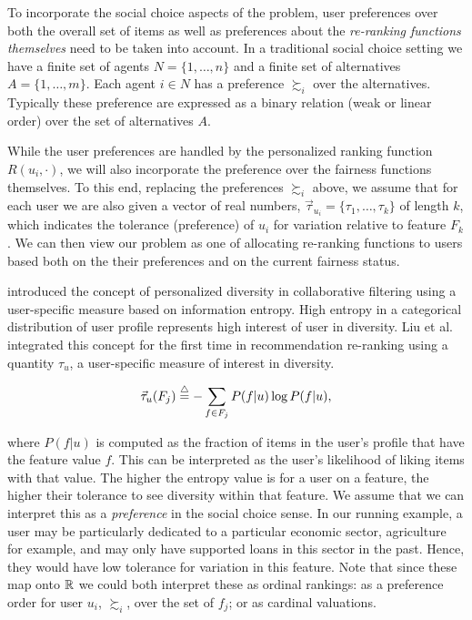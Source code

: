 To incorporate the social choice aspects of the problem, user preferences over both the overall set of items as well as preferences about the \emph{re-ranking functions themselves} need to be taken into account. In a traditional social choice setting we have a finite set of agents $N = \{1, \ldots, n\}$ and a finite set of alternatives $A = \{1, \ldots, m\}$. Each agent $i \in N$ has a preference $\succsim_i$ over the alternatives. Typically these preference are expressed as a binary relation (weak or linear order) over the set of alternatives $A$.  

While the user preferences are handled by the personalized ranking function $R(u_i, \cdot)$, we will also incorporate the preference over the fairness functions themselves. To this end, replacing the preferences $\succsim_i$ above, we assume that for each user we are also given a vector of real numbers, $\vec{\tau}_{u_i} = \{\tau_1, \ldots, \tau_k\}$ of length $k$, which indicates the tolerance (preference) of $u_i$ for variation relative to feature $F_k$.  We can then view our problem as one of allocating re-ranking functions to users based both on the their preferences and on the current fairness status.
 
\cite{eskan2017-personalized-diversity} introduced the concept of personalized diversity in collaborative filtering using a user-specific measure based on information entropy. High entropy in a categorical distribution of user profile represents high interest of user in diversity. Liu et al. \cite{liu2018personalizing,liu2019personalized} integrated this concept for the first time in recommendation re-ranking using a quantity $\tau_u$, a user-specific measure of interest in diversity.

\begin{equation}
\vec{\tau}_u(F_{j})\buildrel\triangle\over=-\sum_{f \in F_j} P(f|u)\log P(f|u),
\label{eq:tau}
\end{equation}
\vspace{0.25cm}

\noindent where $P(f|u)$ is computed as the fraction of items in the user's profile that have the feature value $f$. This can be interpreted as the user's likelihood of liking items with that value. The higher the entropy value is for a user on a feature, the higher their tolerance to see diversity within that feature. We assume that we can interpret this as a \emph{preference} in the social choice sense. In our running example, a user may be particularly dedicated to a particular economic sector, agriculture for example, and may only have supported loans in this sector in the past.  Hence, they would have low tolerance for variation in this feature. Note that since these map onto $\mathbb{R}$ we could both interpret these as ordinal rankings: as a preference order for user $u_i$, $\succsim_i$, over the set of $f_j$; or as cardinal valuations.

